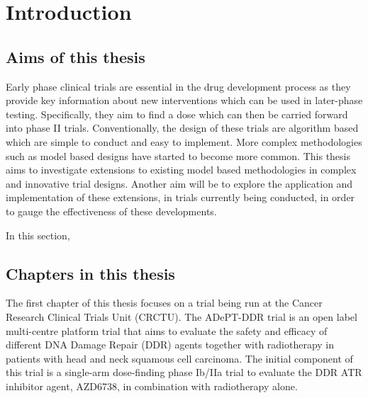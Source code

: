 
\chapter{Introduction} %

\label{Chapter1} %

\section{Aims of this thesis}
Early phase clinical trials are essential in the drug development process as they provide key information about new interventions which can be used in later-phase testing. Specifically, they aim to find a dose which can then be carried forward into phase II trials. Conventionally, the design of these trials are algorithm based which are simple to conduct and easy to implement. More complex methodologies such as model based designs have started to become more common. This thesis aims to investigate extensions to existing model based methodologies in complex and innovative trial designs. Another aim will be to explore the application and implementation of these extensions, in trials currently being conducted, in order to gauge the effectiveness of these developments. 

In this section, 



\section{Chapters in this thesis}

The first chapter of this thesis focuses on a trial being run at the Cancer Research Clinical Trials Unit (CRCTU). The ADePT-DDR trial is an open label multi-centre platform trial that aims to evaluate the safety and efficacy of different DNA Damage Repair (DDR) agents together with radiotherapy in patients with head and neck squamous cell carcinoma. The initial component of this trial is a single-arm dose-finding phase Ib/IIa trial to evaluate the DDR ATR inhibitor agent, AZD6738, in combination with radiotherapy alone.

